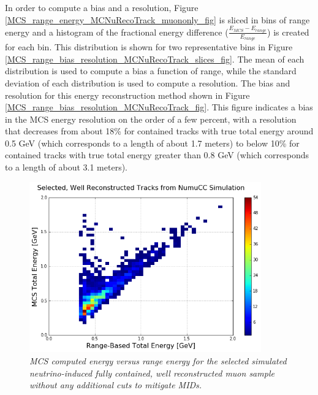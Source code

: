 In order to compute a bias and a resolution, Figure \ref{MCS_range_energy_MCNuRecoTrack_muononly_fig} is sliced in bins of range energy and a histogram of the fractional energy difference ($\frac{E_{MCS} - E_{range}}{E_{range}}$) is created for each bin. This distribution is shown for two representative bins in Figure \ref{MCS_range_bias_resolution_MCNuRecoTrack_slices_fig}. The mean of each distribution is used to compute a bias a function of range, while the standard deviation of each distribution is used to compute a resolution. The bias and resolution for this energy reconstruction method shown in Figure \ref{MCS_range_bias_resolution_MCNuRecoTrack_fig}. This figure indicates a bias in the MCS energy resolution on the order of a few percent, with a resolution that decreases from about 18\% for contained tracks with true total energy around 0.5 GeV (which corresponds to a length of about 1.7 meters) to below 10\% for contained tracks with true total energy greater than 0.8 GeV (which corresponds to a length of about 3.1 meters).


\begin{figure}[h!]
\begin{center}
\includegraphics[width=100mm]{Figures/MCS_range_comparison_MCNuRecoTracks_noPDGcut.png}
\end{center}
\caption{\textit{MCS computed energy versus range energy for the selected simulated neutrino-induced fully contained, well reconstructed muon sample without any additional cuts to mitigate MIDs.}}
\label{MCS_range_energy_MCNuRecoTrack_noPDGcut_fig}
\end{figure}

